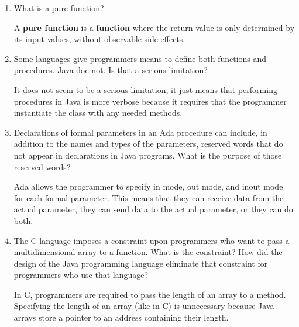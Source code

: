 \begin{enumerate}
  \item What is a pure function?

  \begin{answer}

    A \textbf{pure function} is a \textbf{function} where the return value
    is only determined by its input values, without
    observable side effects.

  \end{answer}

  \item Some languages give programmers means to define
    both functions and procedures. Java doe not. Is that
    a serious limitation?

  \begin{answer}

    It does not seem to be a serious limitation, it just means
    that performing procedures in Java is more verbose because
    it requires that the programmer instantiate the class with
    any needed methods.

  \end{answer}

  \item Declarations of formal parameters in an Ada procedure
    can include, in addition to the names and types of the
    parameters, reserved words that do not appear in declarations
    in Java programs. 
    What is the purpose of those reserved words?

  \begin{answer}

    Ada allows the programmer to specify in mode, out mode,
    and inout mode for each formal parameter.  This means that
    they can receive data from the actual parameter, they can
    send data to the actual parameter, or they can do both.

  \end{answer}

  \item The C language imposes a constraint upon programmers
    who want to pass a multidimensional array to a function.
    What is the constraint? How did the design of the Java
    programming language eliminate that constraint for 
    programmers who use that language?

  \begin{answer}

    In C, programmers are required to pass the length of an
    array to a method. Specifying the length of an array
    (like in C) is unnecessary because Java arrays store a
    pointer to an address containing their length.


\end{answer}
\end{enumerate}
